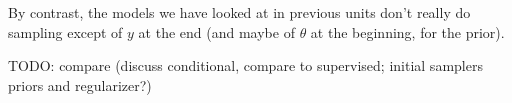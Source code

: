 By contrast, the models we have looked at in previous units don't
really do sampling except of $y$ at the end (and maybe of $\theta$
at the beginning, for the prior).

TODO: compare (discuss conditional, compare to supervised; initial samplers priors and regularizer?)






